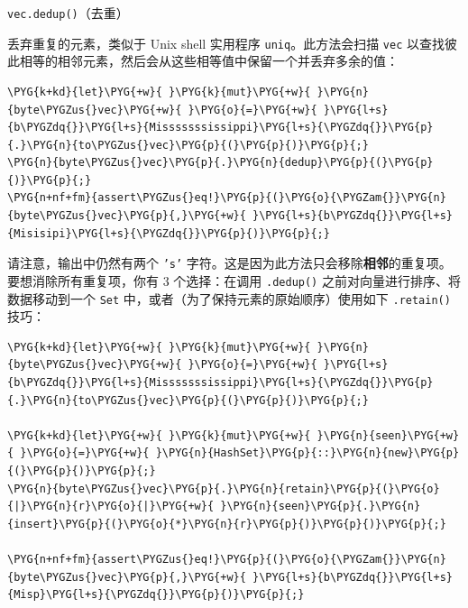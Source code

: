 \begin{mySidenote}
\texttt{vec.dedup()}（去重）
\end{mySidenote}

丢弃重复的元素，类似于 Unix shell 实用程序 \texttt{uniq}。此方法会扫描 \texttt{vec} 以查找彼此相等的相邻元素，然后会从这些相等值中保留一个并丢弃多余的值：

\begin{Verbatim}[commandchars=\\\{\},breaklines=true,breakanywhere=true,fontsize=\codefont,xleftmargin=17bp]
\PYG{k+kd}{let}\PYG{+w}{ }\PYG{k}{mut}\PYG{+w}{ }\PYG{n}{byte\PYGZus{}vec}\PYG{+w}{ }\PYG{o}{=}\PYG{+w}{ }\PYG{l+s}{b\PYGZdq{}}\PYG{l+s}{Misssssssissippi}\PYG{l+s}{\PYGZdq{}}\PYG{p}{.}\PYG{n}{to\PYGZus{}vec}\PYG{p}{(}\PYG{p}{)}\PYG{p}{;}
\PYG{n}{byte\PYGZus{}vec}\PYG{p}{.}\PYG{n}{dedup}\PYG{p}{(}\PYG{p}{)}\PYG{p}{;}
\PYG{n+nf+fm}{assert\PYGZus{}eq!}\PYG{p}{(}\PYG{o}{\PYGZam{}}\PYG{n}{byte\PYGZus{}vec}\PYG{p}{,}\PYG{+w}{ }\PYG{l+s}{b\PYGZdq{}}\PYG{l+s}{Misisipi}\PYG{l+s}{\PYGZdq{}}\PYG{p}{)}\PYG{p}{;}
\end{Verbatim}

请注意，输出中仍然有两个 \texttt{'s'} 字符。这是因为此方法只会移除\textbf{相邻}的重复项。要想消除所有重复项，你有 3 个选择：在调用 \texttt{.dedup()} 之前对向量进行排序、将数据移动到一个 \texttt{Set} 中，或者（为了保持元素的原始顺序）使用如下 \texttt{.retain()} 技巧：

\begin{Verbatim}[commandchars=\\\{\},breaklines=true,breakanywhere=true,fontsize=\codefont,xleftmargin=17bp]
\PYG{k+kd}{let}\PYG{+w}{ }\PYG{k}{mut}\PYG{+w}{ }\PYG{n}{byte\PYGZus{}vec}\PYG{+w}{ }\PYG{o}{=}\PYG{+w}{ }\PYG{l+s}{b\PYGZdq{}}\PYG{l+s}{Misssssssissippi}\PYG{l+s}{\PYGZdq{}}\PYG{p}{.}\PYG{n}{to\PYGZus{}vec}\PYG{p}{(}\PYG{p}{)}\PYG{p}{;}

\PYG{k+kd}{let}\PYG{+w}{ }\PYG{k}{mut}\PYG{+w}{ }\PYG{n}{seen}\PYG{+w}{ }\PYG{o}{=}\PYG{+w}{ }\PYG{n}{HashSet}\PYG{p}{::}\PYG{n}{new}\PYG{p}{(}\PYG{p}{)}\PYG{p}{;}
\PYG{n}{byte\PYGZus{}vec}\PYG{p}{.}\PYG{n}{retain}\PYG{p}{(}\PYG{o}{|}\PYG{n}{r}\PYG{o}{|}\PYG{+w}{ }\PYG{n}{seen}\PYG{p}{.}\PYG{n}{insert}\PYG{p}{(}\PYG{o}{*}\PYG{n}{r}\PYG{p}{)}\PYG{p}{)}\PYG{p}{;}

\PYG{n+nf+fm}{assert\PYGZus{}eq!}\PYG{p}{(}\PYG{o}{\PYGZam{}}\PYG{n}{byte\PYGZus{}vec}\PYG{p}{,}\PYG{+w}{ }\PYG{l+s}{b\PYGZdq{}}\PYG{l+s}{Misp}\PYG{l+s}{\PYGZdq{}}\PYG{p}{)}\PYG{p}{;}
\end{Verbatim}

